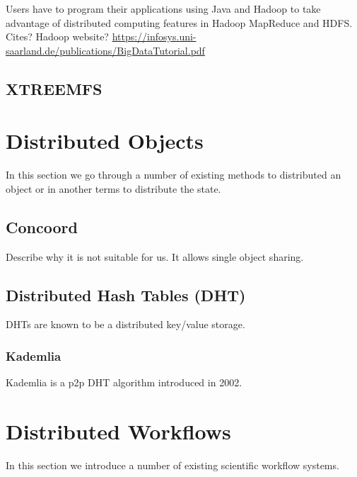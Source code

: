 Users have to program their applications using Java and Hadoop to 
take advantage of distributed computing features in Hadoop MapReduce
and HDFS. Cites? Hadoop website?
\url{https://infosys.uni-saarland.de/publications/BigDataTutorial.pdf}

\subsection{XTREEMFS}

\section{Distributed Objects}
In this section we go through a number of existing methods to distributed an object or in another terms to distribute the state.

\subsection{Concoord}
Describe why it is not suitable for us. It allows single object sharing.

\subsection{Distributed Hash Tables (DHT)}
DHTs are known to be a distributed key/value storage.

\subsubsection{Kademlia}
Kademlia is a p2p DHT algorithm introduced in 2002.

\section{Distributed Workflows}
In this section we introduce a number of existing scientific workflow systems.